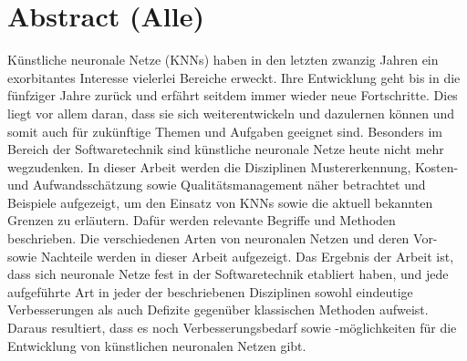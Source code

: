 \section*{Abstract (Alle)}
Künstliche neuronale Netze (KNNs) haben in den letzten zwanzig Jahren ein exorbitantes Interesse vielerlei Bereiche erweckt. Ihre Entwicklung geht bis in die fünfziger Jahre zurück und erfährt seitdem immer wieder neue Fortschritte. Dies liegt vor allem daran, dass sie sich weiterentwickeln und dazulernen können und somit auch für zukünftige Themen und Aufgaben geeignet sind. Besonders im Bereich der Softwaretechnik sind künstliche neuronale Netze heute nicht mehr wegzudenken. In dieser Arbeit werden die Disziplinen Mustererkennung, Kosten- und Aufwandsschätzung sowie Qualitätsmanagement näher betrachtet und Beispiele aufgezeigt, um den Einsatz von KNNs sowie die aktuell bekannten Grenzen zu erläutern. Dafür werden relevante Begriffe und Methoden beschrieben. Die verschiedenen Arten von neuronalen Netzen und deren Vor- sowie Nachteile werden in dieser Arbeit aufgezeigt. Das Ergebnis der Arbeit ist, dass sich neuronale Netze fest in der Softwaretechnik etabliert haben, und jede aufgeführte Art in jeder der beschriebenen Disziplinen sowohl eindeutige Verbesserungen als auch Defizite gegenüber klassischen Methoden aufweist. Daraus resultiert, dass es noch Verbesserungsbedarf sowie -möglichkeiten für die Entwicklung von künstlichen neuronalen Netzen gibt.